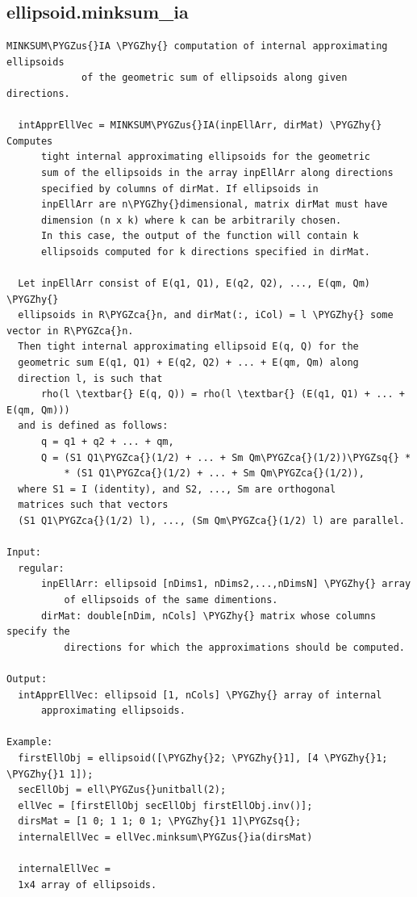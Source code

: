 \documentclass[letterpaper,10pt,english]{sphinxmanual}
\def\PYGZus{\char`\_}
\def\PYGZca{\char`\^}
\def\PYGZhy{\char`\-}
\def\PYGZsq{\char`\'}
\begin{document}
\subsection{ellipsoid.minksum\_ia}
\label{chap_functions:ellipsoid-minksum-ia}
\begin{Verbatim}[commandchars=\\\{\}]
MINKSUM\PYGZus{}IA \PYGZhy{} computation of internal approximating ellipsoids
             of the geometric sum of ellipsoids along given directions.

  intApprEllVec = MINKSUM\PYGZus{}IA(inpEllArr, dirMat) \PYGZhy{} Computes
      tight internal approximating ellipsoids for the geometric
      sum of the ellipsoids in the array inpEllArr along directions
      specified by columns of dirMat. If ellipsoids in
      inpEllArr are n\PYGZhy{}dimensional, matrix dirMat must have
      dimension (n x k) where k can be arbitrarily chosen.
      In this case, the output of the function will contain k
      ellipsoids computed for k directions specified in dirMat.

  Let inpEllArr consist of E(q1, Q1), E(q2, Q2), ..., E(qm, Qm) \PYGZhy{}
  ellipsoids in R\PYGZca{}n, and dirMat(:, iCol) = l \PYGZhy{} some vector in R\PYGZca{}n.
  Then tight internal approximating ellipsoid E(q, Q) for the
  geometric sum E(q1, Q1) + E(q2, Q2) + ... + E(qm, Qm) along
  direction l, is such that
      rho(l \textbar{} E(q, Q)) = rho(l \textbar{} (E(q1, Q1) + ... + E(qm, Qm)))
  and is defined as follows:
      q = q1 + q2 + ... + qm,
      Q = (S1 Q1\PYGZca{}(1/2) + ... + Sm Qm\PYGZca{}(1/2))\PYGZsq{} *
          * (S1 Q1\PYGZca{}(1/2) + ... + Sm Qm\PYGZca{}(1/2)),
  where S1 = I (identity), and S2, ..., Sm are orthogonal
  matrices such that vectors
  (S1 Q1\PYGZca{}(1/2) l), ..., (Sm Qm\PYGZca{}(1/2) l) are parallel.

Input:
  regular:
      inpEllArr: ellipsoid [nDims1, nDims2,...,nDimsN] \PYGZhy{} array
          of ellipsoids of the same dimentions.
      dirMat: double[nDim, nCols] \PYGZhy{} matrix whose columns specify the
          directions for which the approximations should be computed.

Output:
  intApprEllVec: ellipsoid [1, nCols] \PYGZhy{} array of internal
      approximating ellipsoids.

Example:
  firstEllObj = ellipsoid([\PYGZhy{}2; \PYGZhy{}1], [4 \PYGZhy{}1; \PYGZhy{}1 1]);
  secEllObj = ell\PYGZus{}unitball(2);
  ellVec = [firstEllObj secEllObj firstEllObj.inv()];
  dirsMat = [1 0; 1 1; 0 1; \PYGZhy{}1 1]\PYGZsq{};
  internalEllVec = ellVec.minksum\PYGZus{}ia(dirsMat)

  internalEllVec =
  1x4 array of ellipsoids.
\end{Verbatim}
\end{document}
